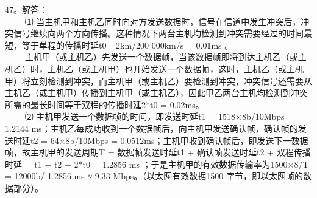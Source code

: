 47。解答： \\
$\qquad$ ⑴ 当主机甲和主机乙同时向对方发送数据时，信号在信道中发生冲突后，冲突信号继续向两个方向传播。这种情况下两台主机均检测到冲突需要经过的时间最短，等于单程的传播时延t0= 2km/200 000km/s =
0.01ms 。 \\
$\qquad$ 主机甲（或主机乙）先发送一个数据帧，当该数据帧即将到达主机乙（或主机乙）时，主机乙（或主机甲）也开始发送一个数据帧，这时，主机乙（或主机甲）将立刻检测到冲突，而主机甲（或主机乙）要检测到冲突，冲突信号还需要从主机乙（或主机甲）传播到主机甲（或主机乙），因此甲乙两台主机均检测到冲突所需的最长时间等于双程的传播时延2*t0 = 0.02ms。 \\
$\qquad$ ⑵ 主机甲发送一个数据帧的时间，即发送时延t1 = 1518×8b/10Mbps = 1.2144 ms；主机乙每成功收到一个数据帧后，向主机甲发送确认帧，确认帧的发送时延t2 = 64×8b/10Mbps = 0.0512ms；主机甲收到确认帧后，即发送下一数据帧，故主机甲的发送周期T = 数据帧发送时延t1 + 确认帧发送时延t2 + 双程传播时延 = t1 + t2 + 2*t0 = 1.2856 ms ；于是主机甲的有效数据传输率为1500×8/T = 12000b/ 1.2856 ms ≈ 9.33 Mbps。（以太网有效数据1500 字节，即以太网帧的数据部分）。
